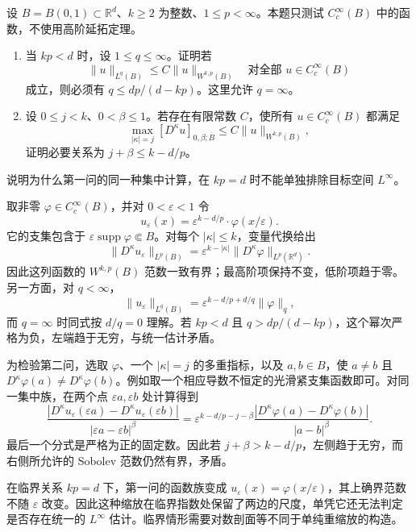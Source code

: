 \begin{optionalexercise}\label{b1:ex:24-higher-order-scaling}
设 \(B=B(0,1)\subset\mathbb R^d\)、\(k\ge2\) 为整数、\(1\le p<\infty\)。本题只测试
\(C_c^\infty(B)\) 中的函数，不使用高阶延拓定理。
\begin{enumerate}
 \item\label{b1:item:24-higher-order-lq-obstruction}
 当 \(kp<d\) 时，设 \(1\le q\le\infty\)。证明若
 \[
  \|u\|_{L^q(B)}\le C\|u\|_{W^{k,p}(B)}
       \quad\text{对全部 }u\in C_c^\infty(B)
 \]
 成立，则必须有 \(q\le dp/(d-kp)\)。这里允许 \(q=\infty\)。
 \item\label{b1:item:24-higher-order-holder-obstruction}
 设 \(0\le j<k\)、\(0<\beta\le1\)。若存在有限常数 \(C\)，使所有
 \(u\in C_c^\infty(B)\) 都满足
 \[
  \max_{|\kappa|=j}[D^\kappa u]_{0,\beta;\overline B}
        \le C\|u\|_{W^{k,p}(B)},
 \]
 证明必要关系为 \(j+\beta\le k-d/p\)。
\end{enumerate}
说明为什么第一问的同一种集中计算，在 \(kp=d\) 时不能单独排除目标空间
\(L^\infty\)。
\end{optionalexercise}
\begin{solution}
取非零 \(\varphi\in C_c^\infty(B)\)，并对 \(0<\varepsilon<1\) 令
\[
 u_\varepsilon(x)=\varepsilon^{k-d/p}\cdot \varphi(x/\varepsilon).
\]
它的支集包含于 \(\varepsilon\operatorname{supp}\varphi\Subset B\)。对每个
\(|\kappa|\le k\)，变量代换给出
\[
 \|D^\kappa u_\varepsilon\|_{L^p(B)}
       =\varepsilon^{k-|\kappa|}
                    \|D^\kappa\varphi\|_{L^p(\mathbb R^d)}.
\]
因此这列函数的 \(W^{k,p}(B)\) 范数一致有界；最高阶项保持不变，低阶项趋于零。
另一方面，对 \(q<\infty\)，
\[
 \|u_\varepsilon\|_{L^q(B)}
       =\varepsilon^{k-d/p+d/q}\|\varphi\|_q,
\]
而 \(q=\infty\) 时同式按 \(d/q=0\) 理解。若 \(kp<d\) 且
\(q>dp/(d-kp)\)，这个幂次严格为负，左端趋于无穷，与统一估计矛盾。

为检验第二问，选取 \(\varphi\)、一个 \(|\kappa|=j\) 的多重指标，以及
\(a,b\in B\)，使 \(a\ne b\) 且
\(D^\kappa\varphi(a)\ne D^\kappa\varphi(b)\)。例如取一个相应导数不恒定的光滑紧支集函数即可。对同一集中族，在两个点
\(\varepsilon a,\varepsilon b\) 处计算得到
\[
 \frac{|D^\kappa u_\varepsilon(\varepsilon a)
             -D^\kappa u_\varepsilon(\varepsilon b)|}
      {|\varepsilon a-\varepsilon b|^\beta}
 =\varepsilon^{k-d/p-j-\beta}
       \frac{|D^\kappa\varphi(a)-D^\kappa\varphi(b)|}
            {|a-b|^\beta}.
\]
最后一个分式是严格为正的固定数。因此若
\(j+\beta>k-d/p\)，左侧趋于无穷，而右侧所允许的 Sobolev 范数仍然有界，矛盾。

在临界关系 \(kp=d\) 下，第一问的函数族变成
\(u_\varepsilon(x)=\varphi(x/\varepsilon)\)，其上确界范数不随 \(\varepsilon\) 改变。因此这种缩放在临界指数处保留了两边的尺度，单凭它还无法判定是否存在统一的 \(L^\infty\) 估计。临界情形需要对数剖面等不同于单纯重缩放的构造。
\end{solution}

